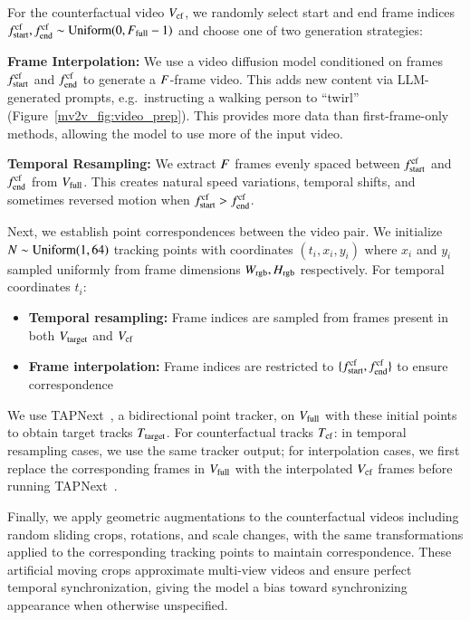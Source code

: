 For the counterfactual video $V_{\text{cf}}$, we randomly select start and end frame indices $f_{\text{start}}^{\text{cf}}, f_{\text{end}}^{\text{cf}} \sim \text{Uniform}(0, F_{\text{full}}-1)$ and choose one of two generation strategies:

\noindent \textbf{Frame Interpolation:} We use a video diffusion model conditioned on frames $f_{\text{start}}^{\text{cf}}$ and $f_{\text{end}}^{\text{cf}}$ to generate a $F$-frame video. This adds new content via LLM-generated prompts, e.g.\ instructing a walking person to ``twirl'' (Figure~\ref{mv2v_fig:video_prep}). This provides more data than first-frame-only methods, allowing the model to use more of the input video.

\noindent \textbf{Temporal Resampling:} We extract $F$ frames evenly spaced between $f_{\text{start}}^{\text{cf}}$ and $f_{\text{end}}^{\text{cf}}$ from $V_{\text{full}}$. This creates natural speed variations, temporal shifts, and sometimes reversed motion when $f_{\text{start}}^{\text{cf}} > f_{\text{end}}^{\text{cf}}$.

Next, we establish point correspondences between the video pair. We initialize $N \sim \text{Uniform}(1, 64)$ tracking points with coordinates $(t_i, x_i, y_i)$ where $x_i$ and $y_i$ sampled uniformly from frame dimensions $W_{\text{rgb}}, H_{\text{rgb}}$ respectively. For temporal coordinates $t_i$:
\begin{itemize}
    \item \textbf{Temporal resampling:} Frame indices are sampled from frames present in both $V_{\text{target}}$ and $V_{\text{cf}}$
    \item \textbf{Frame interpolation:} Frame indices are restricted to $\{f_{\text{start}}^{\text{cf}}, f_{\text{end}}^{\text{cf}}\}$ to ensure correspondence
\end{itemize}

We use TAPNext~\cite{tapnext}, a bidirectional point tracker, on $V_{\text{full}}$ with these initial points to obtain target tracks $T_{\text{target}}$. For counterfactual tracks $T_{\text{cf}}$: in temporal resampling cases, we use the same tracker output; for interpolation cases, we first replace the corresponding frames in $V_{\text{full}}$ with the interpolated $V_{\text{cf}}$ frames before running TAPNext~\cite{tapnext}.

Finally, we apply geometric augmentations to the counterfactual videos including random sliding crops, rotations, and scale changes, with the same transformations applied to the corresponding tracking points to maintain correspondence. These artificial moving crops approximate multi-view videos and ensure perfect temporal synchronization, giving the model a bias toward synchronizing appearance when otherwise unspecified.

